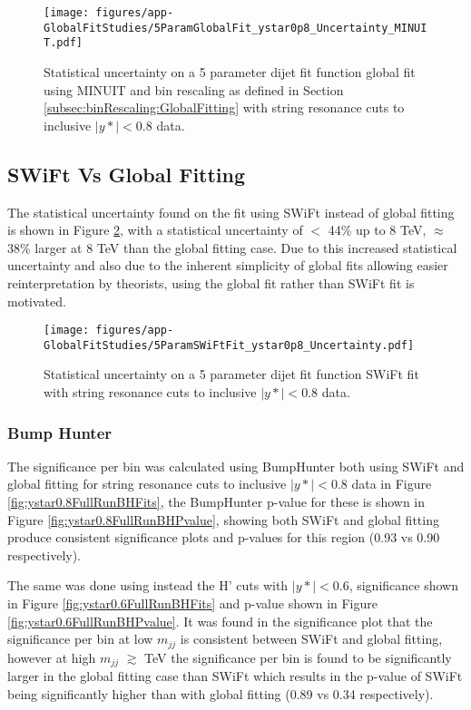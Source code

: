 \begin{figure}
    \centering
    \texttt{[image: figures/app-GlobalFitStudies/5ParamGlobalFit\_ystar0p8\_Uncertainty\_MINUIT.pdf]}
    \caption{Statistical uncertainty on a 5 parameter dijet fit function global fit using MINUIT and bin rescaling as defined in Section \ref{subsec:binRescaling:GlobalFitting} with string resonance cuts to inclusive $|y*|<0.8$ data.}
    \label{fig:5ParamMINUITComparison}
\end{figure}


\subsection{SWiFt Vs Global Fitting}

The statistical uncertainty found on the fit using SWiFt instead of global fitting is shown in Figure \ref{fig:SWiFtStatisticalUncertaintyYstar0.8}, with a statistical uncertainty of $ < $ 44\% up to 8 TeV, $\approx$ 38\% larger at 8 TeV than the global fitting case. Due to this increased statistical uncertainty and also due to the inherent simplicity of global fits allowing easier reinterpretation by theorists, using the global fit rather than SWiFt fit is motivated.

\begin{figure}
    \centering
    \texttt{[image: figures/app-GlobalFitStudies/5ParamSWiFtFit\_ystar0p8\_Uncertainty.pdf]}
    \caption{Statistical uncertainty on a 5 parameter dijet fit function SWiFt fit with string resonance cuts to inclusive $|y*|<0.8$ data.}
    \label{fig:SWiFtStatisticalUncertaintyYstar0.8}
\end{figure}

\subsubsection{Bump Hunter}

The significance per bin was calculated using BumpHunter both using SWiFt and global fitting for string resonance cuts to inclusive $|y*|<0.8$ data in Figure \ref{fig:ystar0.8FullRunBHFits}, the BumpHunter p-value for these is shown in Figure \ref{fig:ystar0.8FullRunBHPvalue}, showing both SWiFt and global fitting produce consistent significance plots and p-values for this region (0.93 vs 0.90 respectively).

The same was done using instead the H' cuts with $|y*|<0.6$, significance shown in Figure \ref{fig:ystar0.6FullRunBHFits} and p-value shown in Figure \ref{fig:ystar0.6FullRunBHPvalue}. It was found in the significance plot that the significance per bin at low $m_{jj}$ is consistent between SWiFt and global fitting, however at high $m_{jj}$ $\gtrsim$ TeV the significance per bin is found to be significantly larger in the global fitting case than SWiFt which results in the p-value of SWiFt being significantly higher than with global fitting (0.89 vs 0.34 respectively).

